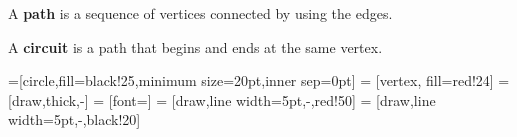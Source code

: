 \documentclass{beamer}
\theoremstyle{definition}
\begin{document}
\begin{frame}
\begin{definition}[Path]
A \textbf{path} is a sequence of vertices connected by using the edges.
\end{definition}

\begin{definition}[Circuit]
A \textbf{circuit} is a path that begins and ends at the same vertex.
\end{definition}

=[circle,fill=black!25,minimum size=20pt,inner sep=0pt]
 = [vertex, fill=red!24]
 = [draw,thick,-]
 = [font=\small]
 = [draw,line width=5pt,-,red!50]
 = [draw,line width=5pt,-,black!20]


\begin{figure}
\end{figure}


\end{frame}
\end{document}
